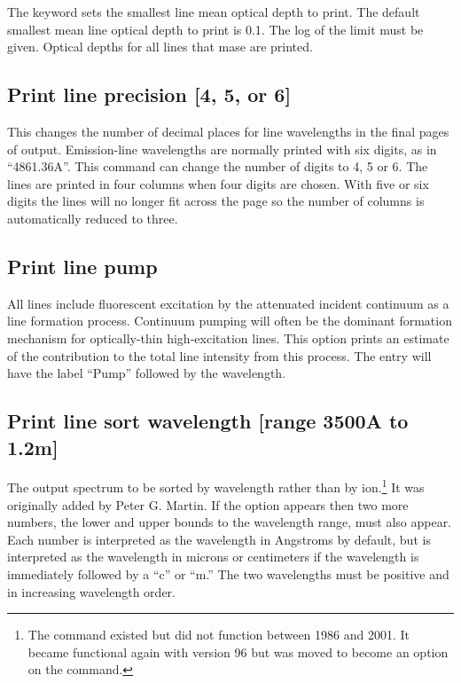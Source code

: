 The keyword  sets the smallest line mean optical depth to print.
The
default smallest mean line optical depth to print is 0.1.
The log of the limit
must be given.
Optical depths for all lines that mase are printed.

\subsection{Print line precision [4, 5, or 6]}

This changes the number of decimal places for line wavelengths in the final pages of
output.
Emission-line wavelengths are normally printed with six digits,
as in ``4861.36A''.
This command can change the number of digits to 4, 5 or 6.
The lines are printed in four columns when four digits are chosen.
With five or six digits the lines will no longer fit across the page so
the number of columns is automatically reduced to three.


\subsection{Print line pump}

All lines include fluorescent excitation by the attenuated incident
continuum as a line formation process.
Continuum pumping will often be
the dominant formation mechanism for optically-thin high-excitation lines.
This option prints an estimate of the contribution to the total line
intensity from this process.
The entry will have the label ``Pump'' followed by the wavelength.

\subsection{Print line sort wavelength [range 3500A to 1.2m]}

The output spectrum to be sorted by wavelength rather than by
ion.\footnote{The  command existed but did not function between 1986
and 2001.  It became functional again with version 96 but was moved to become
an option on the  command.}
It was originally added by Peter G. Martin.
If the  option appears
then two more numbers, the lower and upper bounds to the wavelength range,
must also appear.
Each number is interpreted as the wavelength in Angstroms
by default, but is interpreted as the wavelength in microns or centimeters
if the wavelength is immediately followed by a ``c'' or ``m.''
The two
wavelengths must be positive and in increasing wavelength order.

